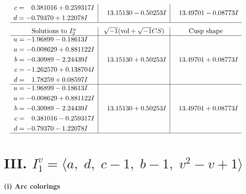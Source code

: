\documentclass[1p]{elsarticle_modified}
\theoremstyle{definition}
\newcommand{\I}{\sqrt{-1}}
\begin{document}
$$\begin{array}{c|c|c}
\begin{aligned}
c &= \phantom{-}0.381016 + 0.259317 I \\
d &= -0.79370 + 1.22078 I\end{aligned}
 & \phantom{-}13.15130 - 0.50253 I & \phantom{-}13.49701 - 0.08773 I\\
 \hline 
 \end{array}$$\newpage$$\begin{array}{c|c|c}  
\text{Solutions to }I^u_{2}& \I (\text{vol} + \sqrt{-1}CS) & \text{Cusp shape}\\
 \hline 
\begin{aligned}
u &= -1.96899 - 0.18613 I \\
a &= -0.008629 + 0.881122 I \\
b &= -0.30989 - 2.24439 I \\
c &= -1.262570 + 0.138704 I \\
d &= \phantom{-}1.78259 + 0.08597 I\end{aligned}
 & \phantom{-}13.15130 + 0.50253 I & \phantom{-}13.49701 + 0.08773 I \\ \hline\begin{aligned}
u &= -1.96899 - 0.18613 I \\
a &= -0.008629 + 0.881122 I \\
b &= -0.30989 - 2.24439 I \\
c &= \phantom{-}0.381016 - 0.259317 I \\
d &= -0.79370 - 1.22078 I\end{aligned}
 & \phantom{-}13.15130 + 0.50253 I & \phantom{-}13.49701 + 0.08773 I\\
 \hline 
 \end{array}$$\newpage\newpage\renewcommand{\arraystretch}{1}
\centering \section*{III. $I^v_{1}= \langle a,\;d,\;c-1,\;b-1,\;v^2- v+1 \rangle$}
\flushleft \textbf{(i) Arc colorings}\\
\end{document}
